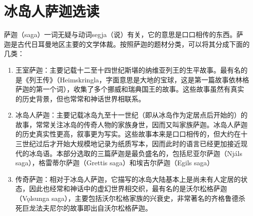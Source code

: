 \chapter{冰岛人萨迦选读}
萨迦（saga）一词无疑与动词segja（说）有关，它的意思是口口相传的东西。萨迦是古代日耳曼地区主要的文学体裁。按照萨迦的题材分类，可以将其分成下面的几类：
\begin{enumerate}
  \item 王室萨迦：主要记载十二至十四世纪斯堪的纳维亚列王的生平故事。最有名的是《列王传》（Heimskringla，字面意思是大地的宝球，这是第一篇故事依林格萨迦的第一个词），收集了多个挪威和瑞典国王的故事。这些故事虽然有真实的历史背景，但也常常和神话世界相联系。

  \item 冰岛人萨迦：主要记载冰岛九至十一世纪（即从冰岛作为定居点后开始的）的故事，常常关注冰岛的传奇人物的家族身世，因而又叫家族萨迦。冰岛人萨迦的历史真实性更高，叙事更为写实。这些故事本来是口口相传的，但大约在十三世纪过后才开始大规模地记录为纸质写本，因而此时的语言已经更加接近现代的冰岛语。本部分选取的三篇萨迦是最负盛名的，包括尼亚尔萨迦（Njáls saga），格雷蒂尔萨迦（Grettis saga）和埃吉尔萨迦（Egils saga）

  \item 传奇萨迦：相对于冰岛人萨迦，它描写的冰岛大陆基本上是尚未有人定居的状态，因此也经常和神话中的虚幻世界相交织，最有名的是沃尔松格萨迦（Vǫlsunga saga），主要包括沃尔松格家族的兴衰史，非常著名的齐格鲁德杀死巨龙法夫尼尔的故事即出自沃尔松格萨迦。
\end{enumerate}

